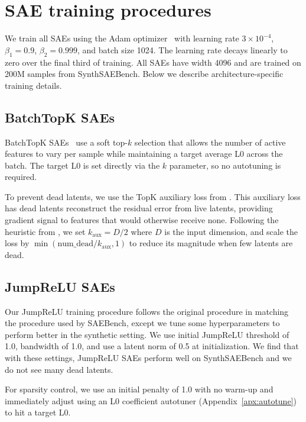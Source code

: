 \documentclass{article}
\theoremstyle{plain}
\theoremstyle{definition}
\theoremstyle{remark}
\begin{document}
\section{SAE training procedures}
\label{apx:training}

We train all SAEs using the Adam optimizer~\citep{kingma2014adam} with learning rate $3 \times 10^{-4}$, $\beta_1 = 0.9$, $\beta_2 = 0.999$, and batch size 1024. The learning rate decays linearly to zero over the final third of training. All SAEs have width 4096 and are trained on 200M samples from SynthSAEBench. Below we describe architecture-specific training details.

\subsection{BatchTopK SAEs}
\label{apx:batchtopk}

BatchTopK SAEs~\citep{bussmann2024batchtopk} use a soft top-$k$ selection that allows the number of active features to vary per sample while maintaining a target average L0 across the batch. The target L0 is set directly via the $k$ parameter, so no autotuning is required.

To prevent dead latents, we use the TopK auxiliary loss from \citet{gao2024scaling}. This auxiliary loss has dead latents reconstruct the residual error from live latents, providing gradient signal to features that would otherwise receive none. Following the heuristic from \citet{gao2024scaling}, we set $k_{\text{aux}} = D/2$ where $D$ is the input dimension, and scale the loss by $\min(\text{num\_dead} / k_{\text{aux}}, 1)$ to reduce its magnitude when few latents are dead.

\subsection{JumpReLU SAEs}
\label{apx:jumprelu}

Our JumpReLU training procedure follows the original procedure in \citet{rajamanoharan2024jumping} matching the procedure used by SAEBench, except we tune some hyperparameters to perform better in the synthetic setting. We use initial JumpReLU threshold of 1.0, bandwidth of 1.0, and use a latent norm of 0.5 at initialization. We find that with these settings, JumpReLU SAEs perform well on SynthSAEBench and we do not see many dead latents.

For sparsity control, we use an initial penalty of 1.0 with no warm-up and immediately adjust using an L0 coefficient autotuner (Appendix~\ref{apx:autotune}) to hit a target L0.
\end{document}
